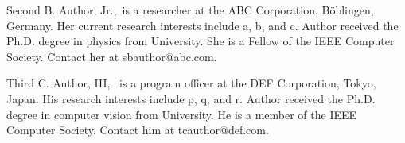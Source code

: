 \documentclass{IEEEcsmag}
\begin{document}
\begin{IEEEbiography}{Second B. Author, Jr.,}{\,} is a researcher at the  ABC Corporation, B\"oblingen, Germany.  Her current research interests include a, b, and c. Author received the Ph.D. degree  in physics from University. She is a Fellow of the IEEE Computer Society. Contact her  at sbauthor@abc.com.\vspace*{8pt}
\end{IEEEbiography}

\begin{IEEEbiography}{Third C. Author, III,} {\,} is a program officer at the  DEF Corporation, Tokyo, Japan.  His research interests include p, q, and r. Author received the Ph.D. degree  in computer vision from University. He is a member of the IEEE Computer Society. Contact him at tcauthor@def.com.
\end{IEEEbiography}
\end{document}
